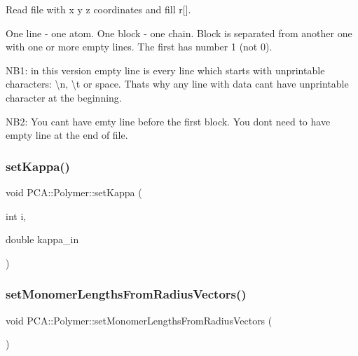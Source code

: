 Read file with x y z coordinates and fill r\mbox{[}\mbox{]}. 

One line -\/ one atom. One block -\/ one chain. Block is separated from another one with one or more empty lines. The first has number 1 (not 0).

N\+B1\+: in this version empty line is every line which starts with unprintable characters\+: \textbackslash{}n, \textbackslash{}t or space. That\textquotesingle{}s why any line with data can\textquotesingle{}t have unprintable character at the beginning.

N\+B2\+: You can\textquotesingle{}t have emty line before the first block. You don\textquotesingle{}t need to have empty line at the end of file. \hypertarget{class_p_c_a_1_1_polymer_ac8631ac2842b00802f24478b525c05db}{}\label{class_p_c_a_1_1_polymer_ac8631ac2842b00802f24478b525c05db} 
\subsubsection{\texorpdfstring{set\+Kappa()}{setKappa()}}
{\footnotesize\ttfamily void P\+C\+A\+::\+Polymer\+::set\+Kappa (\begin{DoxyParamCaption}\item[{int}]{i,  }\item[{double}]{kappa\+\_\+in }\end{DoxyParamCaption})\hspace{0.3cm}{\ttfamily [inline]}}

\hypertarget{class_p_c_a_1_1_polymer_a2dae638afa952c286c16122c7ab52b6e}{}\label{class_p_c_a_1_1_polymer_a2dae638afa952c286c16122c7ab52b6e} 
\subsubsection{\texorpdfstring{set\+Monomer\+Lengths\+From\+Radius\+Vectors()}{setMonomerLengthsFromRadiusVectors()}}
{\footnotesize\ttfamily void P\+C\+A\+::\+Polymer\+::set\+Monomer\+Lengths\+From\+Radius\+Vectors (\begin{DoxyParamCaption}{ }\end{DoxyParamCaption})}


